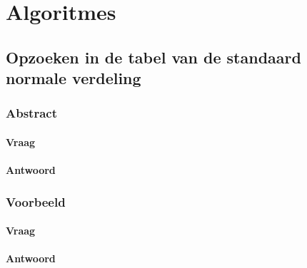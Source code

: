 \documentclass[main.tex]{subfiles}
\begin{document}
\chapter{Algoritmes}
\label{cha:algoritmes}

\section{Opzoeken in de tabel van de standaard normale verdeling}

\subsection{Abstract}
\subsubsection*{Vraag}
\subsubsection*{Antwoord}



\subsection{Voorbeeld}
\subsubsection*{Vraag}
\subsubsection*{Antwoord}
\end{document}
